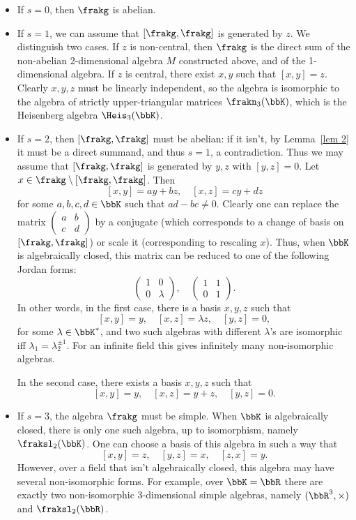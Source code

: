 \begin{itemize}
    \item If $s=0$, then $\frakg$ is abelian.
    \item If $s=1$, we can assume that $[\frakg,\frakg]$ is generated by $z$. We distinguish two cases. If $z$ is non-central, then $\frakg$ is the direct sum of the non-abelian 2-dimensional algebra $M$ constructed above, and of the 1-dimensional algebra. If $z$ is central, there exist $x,y$ such that $[x,y]=z$. Clearly $x,y,z$ must be linearly independent, so the algebra is isomorphic to the algebra of strictly upper-triangular matrices $\frakn_3(\bbK)$, which is the Heisenberg algebra $\Heis_3(\bbK)$.
    \item If $s=2$, then $[\frakg,\frakg]$ must be abelian: if it isn't, by Lemma~\ref{lem 2} it must be a direct summand, and thus $s=1$, a contradiction. Thus we may assume that $[\frakg,\frakg]$ is generated by $y,z$ with $[y,z]=0$. Let $x\in \frakg\setminus[\frakg,\frakg]$. Then
    \[[x,y]=ay+bz,\quad [x,z]=cy+dz\]
    for some $a,b,c,d\in\bbK$ such that $ad-bc\neq 0$. Clearly one can replace the matrix $\begin{pmatrix}
        a&b\\c&d
    \end{pmatrix}$
    by a conjugate (which corresponds to a change of basis on $[\frakg,\frakg]$) or scale it (corresponding to rescaling $x$). Thus, when $\bbK$ is algebraically closed, this matrix can be reduced to one of the following Jordan forms:
    \[\begin{pmatrix}
        1&0\\
        0&\lambda
    \end{pmatrix},\quad 
    \begin{pmatrix}
        1&1\\
        0&1
    \end{pmatrix}.\]
    In other words, in the first case, there is a basis $x,y,z$ such that
    \[[x,y]=y,\quad [x,z]=\lambda z,\quad [y,z]=0,\]
    for some $\lambda\in\bbK^\ast$, and two such algebras with different $\lambda$'s are isomorphic iff $\lambda_1=\lambda_2^{\pm 1}$. For an infinite field this gives infinitely many non-isomorphic algebras. 

    In the second case, there exists a basis $x,y,z$ such that
    \[[x,y]=y,\quad [x,z]=y+z,\quad [y,z]=0.\]

    \item If $s=3$, the algebra $\frakg$ must be simple. When $\bbK$ is algebraically closed, there is only one such algebra, up to isomorphism, namely $\fraksl_2(\bbK)$. One can choose a basis of this algebra in such a way that 
    \[[x,y]=z,\quad [y,z]=x,\quad [z,x]=y.\]
    However, over a field that isn't algebraically closed, this algebra may have several non-isomorphic forms. For example, over $\bbK=\bbR$ there are exactly two non-isomorphic 3-dimensional simple algebras, namely $(\bbR^3,\times)$ and $\fraksl_2(\bbR)$.
\end{itemize}



